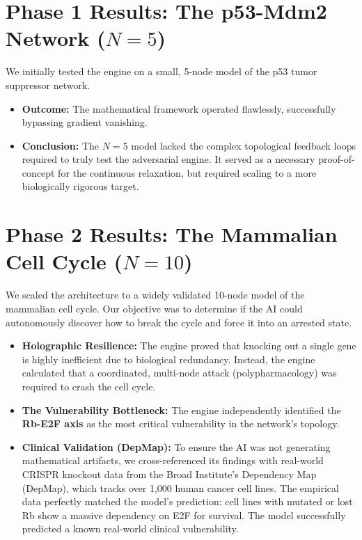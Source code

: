 \documentclass[11pt, letterpaper]{article}
\begin{document}
	\section{Phase 1 Results: The p53-Mdm2 Network ($N=5$)}
	We initially tested the engine on a small, 5-node model of the p53 tumor suppressor network. 
	\begin{itemize}
		\item \textbf{Outcome:} The mathematical framework operated flawlessly, successfully bypassing gradient vanishing.
		\item \textbf{Conclusion:} The $N=5$ model lacked the complex topological feedback loops required to truly test the adversarial engine. It served as a necessary proof-of-concept for the continuous relaxation, but required scaling to a more biologically rigorous target.
	\end{itemize}
	
	\section{Phase 2 Results: The Mammalian Cell Cycle ($N=10$)}
	We scaled the architecture to a widely validated 10-node model of the mammalian cell cycle. Our objective was to determine if the AI could autonomously discover how to break the cycle and force it into an arrested state.
	\begin{itemize}
		\item \textbf{Holographic Resilience:} The engine proved that knocking out a single gene is highly inefficient due to biological redundancy. Instead, the engine calculated that a coordinated, multi-node attack (polypharmacology) was required to crash the cell cycle.
		\item \textbf{The Vulnerability Bottleneck:} The engine independently identified the \textbf{Rb-E2F axis} as the most critical vulnerability in the network's topology. 
		\item \textbf{Clinical Validation (DepMap):} To ensure the AI was not generating mathematical artifacts, we cross-referenced its findings with real-world CRISPR knockout data from the Broad Institute's Dependency Map (DepMap), which tracks over 1,000 human cancer cell lines. The empirical data perfectly matched the model's prediction: cell lines with mutated or lost Rb show a massive dependency on E2F for survival. The model successfully predicted a known real-world clinical vulnerability.
	\end{itemize}
	
\end{document}
